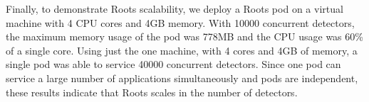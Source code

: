 
Finally, to demonstrate Roots scalability, we deploy
a Roots pod on a virtual machine with 4 CPU cores and 4GB memory.
%
%
%
With 10000 concurrent detectors, the maximum memory usage of the pod was 778MB and the CPU usage
was 60\% of a single core.  Using just the one machine, with 4 cores and 4GB of
memory, a single pod was able to service 40000 concurrent detectors. 
Since one pod can service a large number of applications simultaneously
 and pods are independent, these results indicate that Roots 
scales in the number of detectors.

%
